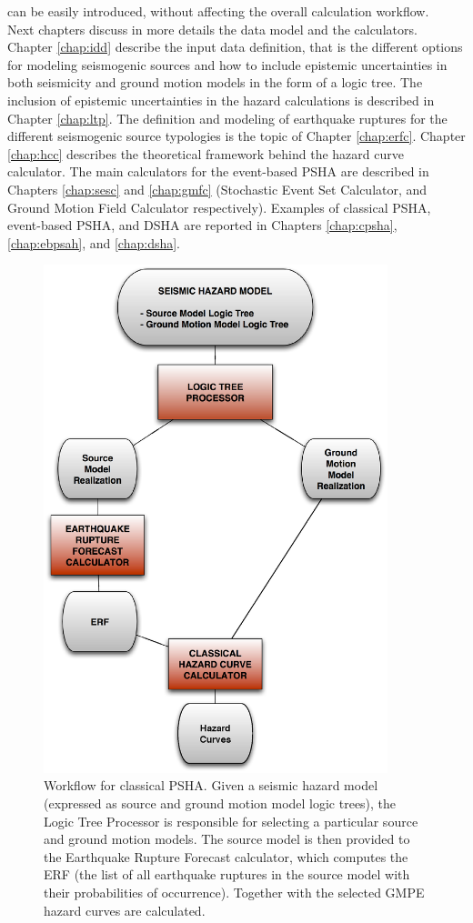can be easily introduced, without affecting the overall calculation workflow.\\
Next chapters discuss in more details the data model and the calculators. 
Chapter \ref{chap:idd} describe the input data definition, that is the 
different options for modeling seismogenic sources and how to include 
epistemic uncertainties in both seismicity and ground motion models in 
the form of a logic tree. The inclusion of epistemic uncertainties in 
the hazard calculations is described in Chapter \ref{chap:ltp}. The 
definition and modeling of earthquake ruptures for the different seismogenic 
source typologies is the topic of Chapter \ref{chap:erfc}. Chapter 
\ref{chap:hcc} describes the theoretical framework behind the hazard 
curve calculator. The main calculators for the event-based PSHA are 
described in Chapters \ref{chap:sesc} and \ref{chap:gmfc} (Stochastic 
Event Set Calculator, and Ground Motion Field Calculator respectively). 
Examples of classical PSHA, event-based PSHA, and DSHA are reported in 
Chapters \ref{chap:cpsha}, \ref{chap:ebpsah}, and \ref{chap:dsha}.
\begin{figure}[htbp]
\begin{center}
\includegraphics[width=10cm]{./Figures/Part_Hazard/classical_psha_workflow.eps}
\caption{Workflow for classical PSHA. Given a seismic hazard model 
(expressed as source and ground motion model logic trees), the Logic Tree 
Processor is responsible for selecting a particular source and ground motion 
models. The source model is then provided to the Earthquake Rupture Forecast 
calculator, which computes the ERF (the list of all earthquake ruptures in the 
source model with their probabilities of occurrence). Together with the selected 
GMPE hazard curves are calculated.}
\label{classical_psha_workflow}
\end{center}
\end{figure}
